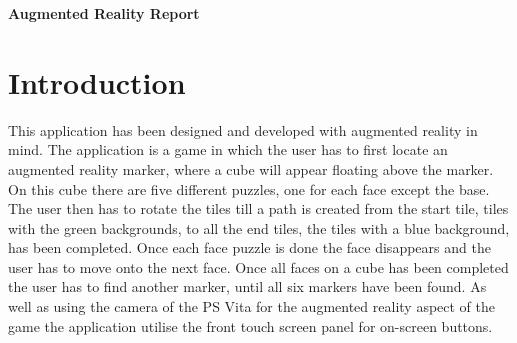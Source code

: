 \begingroup
\begin{center}
	\Large\bf{Augmented Reality Report}
	\end{center}
\endgroup

\section{Introduction}\label{sc:Intro}
This application has been designed and developed with augmented reality in mind.
The application is a game in which the user has to first locate an augmented reality marker, where a cube will appear floating above the marker.
On this cube there are five different puzzles, one for each face except the base.
The user then has to rotate the tiles till a path is created from the start tile, tiles with the green backgrounds, to all the end tiles, the tiles with a blue background, has been completed.
Once each face puzzle is done the face disappears and the user has to move onto the next face. Once all faces on a cube has been completed the user has to find another marker, until all six markers have been found.
As well as using the camera of the PS Vita for the augmented reality aspect of the game the application utilise the front touch screen panel for on-screen buttons. 
